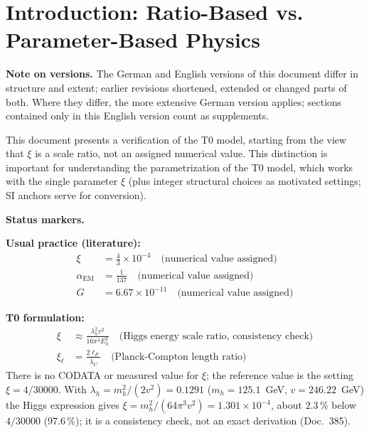 \section{Introduction: Ratio-Based vs. Parameter-Based Physics}

	\medskip\noindent\textbf{Note on versions.} The German and English versions of this document differ in structure and extent; earlier revisions shortened, extended or changed parts of both. Where they differ, the more extensive German version applies; sections contained only in this English version count as supplements.

	
	This document presents a verification of the T0 model, starting from the view that $\xi$ is a scale ratio, not an assigned numerical value. This distinction is important for understanding the parametrization of the T0 model, which works with the single parameter $\xi$ (plus integer structural choices as motivated settings; SI anchors serve for conversion).
	
	\medskip\noindent\textbf{Status markers.}
	
	
	\begin{tcolorbox}[colback=red!5!white,colframe=red!75!black,title=Two Formulations]
		\textbf{Usual practice (literature):}
		\begin{align}
			\xi &= \tfrac{4}{3} \times 10^{-4} \quad \text{(numerical value assigned)} \\
			\alpha_{\text{EM}} &= \frac{1}{137} \quad \text{(numerical value assigned)} \\
			G &= 6.67 \times 10^{-11} \quad \text{(numerical value assigned)}
		\end{align}
		
		\textbf{T0 formulation:}
		\begin{align}
			\xi &\approx \frac{\lambda_h^2 v^2}{16\pi^3 E_h^2} \quad \text{(Higgs energy scale ratio, consistency check)} \\
			\xi_\ell &= \frac{2\ell_P}{\bar{\lambda}_C} \quad \text{(Planck-Compton length ratio)}
		\end{align}
		There is no CODATA or measured value for $\xi$; the reference value is the setting $\xi = 4/30000$. With $\lambda_h = m_h^2/(2v^2) = 0.1291$ ($m_h = 125.1$~GeV, $v = 246.22$~GeV) the Higgs expression gives $\xi = m_h^2/(64\pi^3 v^2) = 1.301\times10^{-4}$, about $2.3\,\%$ below $4/30000$ ($97.6\,\%$); it is a consistency check, not an exact derivation (Doc.~385).
	\end{tcolorbox}
	
